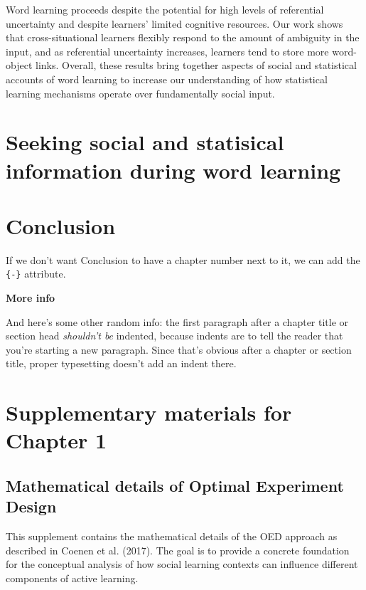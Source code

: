 \documentclass[oneside]{report}
\begin{document}
Word learning proceeds despite the potential for high levels of
referential uncertainty and despite learners' limited cognitive
resources. Our work shows that cross-situational learners flexibly
respond to the amount of ambiguity in the input, and as referential
uncertainty increases, learners tend to store more word-object links.
Overall, these results bring together aspects of social and statistical
accounts of word learning to increase our understanding of how
statistical learning mechanisms operate over fundamentally social input.

\chapter{Seeking social and statisical information during word
learning}\label{speed-nov}

\chapter*{Conclusion}\label{conclusion}

If we don't want Conclusion to have a chapter number next to it, we can
add the \texttt{\{-\}} attribute.

\textbf{More info}

And here's some other random info: the first paragraph after a chapter
title or section head \emph{shouldn't be} indented, because indents are
to tell the reader that you're starting a new paragraph. Since that's
obvious after a chapter or section title, proper typesetting doesn't add
an indent there.

\appendix

\chapter{Supplementary materials for Chapter
1}\label{supplementary-materials-for-chapter-1}

\section{Mathematical details of Optimal Experiment
Design}\label{mathematical-details-of-optimal-experiment-design}

This supplement contains the mathematical details of the OED approach as
described in Coenen et al. (2017). The goal is to provide a concrete
foundation for the conceptual analysis of how social learning contexts
can influence different components of active learning.
\end{document}
